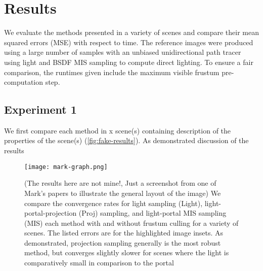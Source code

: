 \section{Results}
\label{sec:results}

We evaluate the methods presented in a variety of scenes and compare their mean squared errors (MSE) with respect to time. The reference images were produced using a large number of samples with an unbiased unidirectional path tracer using light and BSDF MIS sampling to compute direct lighting. To ensure a fair comparison, the runtimes given include the maximum visible frustum pre-computation step.

\subsection*{Experiment 1}


We first compare each method in {\color{red} x} scene(s) containing {\color{red} description of the properties of the scene(s)} (\autoref{fig:fake-results}). As demonstrated {\color{red} discussion of the results}

\begin{figure*}[p]
    \centering
    \texttt{[image: mark-graph.png]}
    \caption{{\color{red} (The results here are not mine!, Just a screenshot from one of Mark's papers to illustrate the general layout of the image)} 
    We compare the convergence rates for light sampling (Light), light-portal-projection (Proj) sampling, and light-portal MIS sampling (MIS) each method with and without frustum culling for a variety of scenes. The listed errors are for the highlighted image insets. As demonstrated, projection sampling generally is the most robust method, but converges slightly slower for scenes where the light is comparatively small in comparison to the portal}
    \label{fig:fake-results}
\end{figure*}